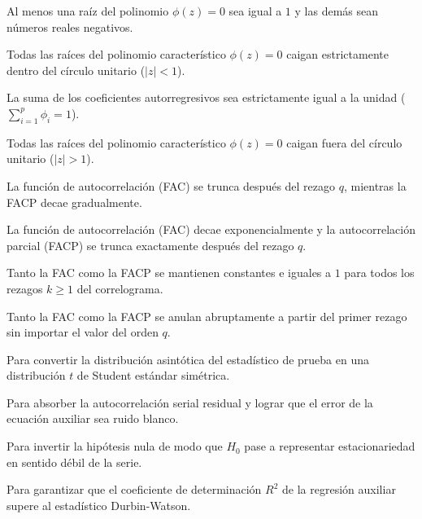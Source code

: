 \begin{opts}
    \item Al menos una raíz del polinomio $\phi(z) = 0$ sea igual a $1$ y las demás sean números reales negativos.
    \item Todas las raíces del polinomio característico $\phi(z) = 0$ caigan estrictamente dentro del círculo unitario ($|z| < 1$).
    \item La suma de los coeficientes autorregresivos sea estrictamente igual a la unidad ($\sum_{i=1}^p \phi_i = 1$).
    \item Todas las raíces del polinomio característico $\phi(z) = 0$ caigan fuera del círculo unitario ($|z| > 1$).
\end{opts}

\begin{opts}
    \item La función de autocorrelación (FAC) se trunca después del rezago $q$, mientras la FACP decae gradualmente.
    \item La función de autocorrelación (FAC) decae exponencialmente y la autocorrelación parcial (FACP) se trunca exactamente después del rezago $q$.
    \item Tanto la FAC como la FACP se mantienen constantes e iguales a $1$ para todos los rezagos $k \ge 1$ del correlograma.
    \item Tanto la FAC como la FACP se anulan abruptamente a partir del primer rezago sin importar el valor del orden $q$.
\end{opts}

\begin{opts}
    \item Para convertir la distribución asintótica del estadístico de prueba en una distribución $t$ de Student estándar simétrica.
    \item Para absorber la autocorrelación serial residual y lograr que el error de la ecuación auxiliar sea ruido blanco.
    \item Para invertir la hipótesis nula de modo que $H_0$ pase a representar estacionariedad en sentido débil de la serie.
    \item Para garantizar que el coeficiente de determinación $R^2$ de la regresión auxiliar supere al estadístico Durbin-Watson.
\end{opts}


